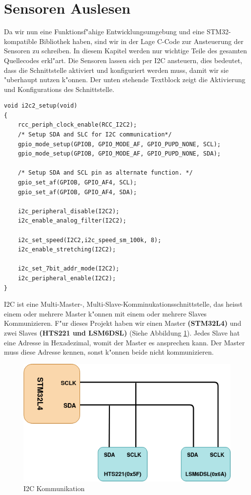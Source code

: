 \section{Sensoren Auslesen} \label{Sensoren}

Da wir nun eine Funktionsf"ahige Entwicklungsumgebung und eine 
STM32-kompatible Bibliothek haben, sind wir in der Lage C-Code zur 
Ansteuerung der Sensoren zu schreiben. In diesem Kapitel werden nur 
wichtige Teile des gesamten Quellecodes erkl"art. Die Sensoren lassen 
sich per I2C ansteuern, dies bedeutet, dass die Schnittstelle aktiviert 
und konfiguriert werden muss, damit wir sie "uberhaupt nutzen k"onnen. 
Der unten stehende Textblock zeigt die Aktivierung und Konfigurations des Schnittstelle.

\begin{lstlisting}[frame=single]
void i2c2_setup(void)
{
	rcc_periph_clock_enable(RCC_I2C2);
	/* Setup SDA and SLC for I2C communication*/
	gpio_mode_setup(GPIOB, GPIO_MODE_AF, GPIO_PUPD_NONE, SCL);
	gpio_mode_setup(GPIOB, GPIO_MODE_AF, GPIO_PUPD_NONE, SDA);

	/* Setup SDA and SCL pin as alternate function. */
	gpio_set_af(GPIOB, GPIO_AF4, SCL);
	gpio_set_af(GPIOB, GPIO_AF4, SDA);

	i2c_peripheral_disable(I2C2);
	i2c_enable_analog_filter(I2C2);

	i2c_set_speed(I2C2,i2c_speed_sm_100k, 8);
	i2c_enable_stretching(I2C2);

	i2c_set_7bit_addr_mode(I2C2);
	i2c_peripheral_enable(I2C2);
}

\end{lstlisting}

I2C ist eine Multi-Master-, Multi-Slave-Komminukationsschnittstelle, 
das heisst einem oder mehrere Master k"onnen mit einem oder mehrere 
Slaves  Kommunizieren. F"ur dieses Projekt haben wir einen Master 
\textbf{(STM32L4)} und zwei Slaves  \textbf{(HTS221 und LSM6DSL)} 
(Siehe Abbildung \ref{fig:I2C}). 
Jedes Slave hat eine Adresse in Hexadezimal, womit der Master es 
ansprechen kann. Der Master muss diese Adresse kennen, sonst k"onnen 
beide nicht kommunizieren. 

\begin{figure}[h]
	\centering
	\includegraphics[width=13cm]{source/images/I2C}
	\caption{I2C Kommunikation\label{fig:I2C}}
\end{figure}

